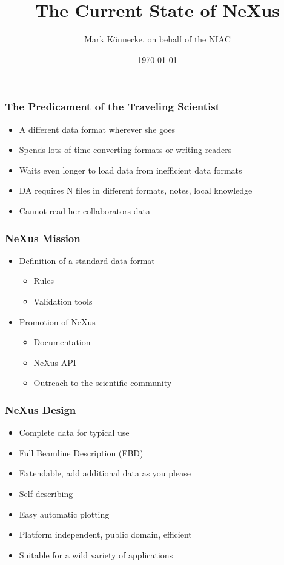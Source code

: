 \documentclass{beamer}
\title{The Current State of NeXus}
\author{Mark K\"onnecke, on behalf of the NIAC }
\institute{Paul Scherrer Institute\\Switzerland }
\date{\today}
\begin{document}
\begin{frame}
\titlepage
\end{frame}

\begin{frame}
\frametitle{The Predicament of the Traveling Scientist}
\begin{itemize}
\item<1->A different data format wherever she goes
\item<2->Spends lots of time converting formats or writing readers
\item<3->Waits even longer to load data from inefficient data formats
\item<4->DA requires N files in different  formats, notes, local knowledge 
\item<5->Cannot read her collaborators data
\end{itemize}
\end{frame}

\begin{frame} \frametitle{NeXus Mission}
\begin{itemize}
\item Definition of a standard data format
\begin{itemize}
\item Rules
\item Validation tools
\end{itemize}
\item Promotion of NeXus
\begin{itemize}
\item Documentation
\item NeXus API
\item Outreach to the scientific community
\end{itemize}
\end{itemize}
\end{frame}


\begin{frame} \frametitle{NeXus Design}
\begin{itemize}
\item Complete data for typical use
\item Full Beamline Description (FBD)
\item Extendable, add additional data as you please
\item Self describing
\item Easy automatic plotting
\item Platform independent, public domain, efficient
\item Suitable for a wild variety of applications
\end{itemize}
\end{frame}
\end{document}
